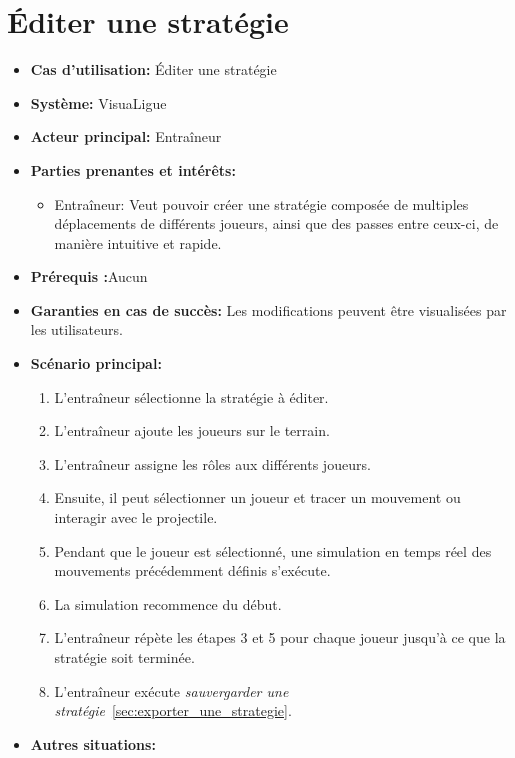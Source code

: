 \section{\'Editer une stratégie}
\label{sec:ajouter_une_strategie}
\begin{itemize}
    \item \textbf{Cas d'utilisation:} \'Editer une strat\'egie
    \item \textbf{Syst\`eme:} VisuaLigue
    \item \textbf{Acteur principal:} Entra\^ineur
    \item \textbf{Parties prenantes et int\'er\^ets:}
        \begin{itemize}
            \item Entraîneur: Veut pouvoir créer une stratégie composée de multiples déplacements de différents joueurs, ainsi que des passes entre ceux-ci, de manière intuitive et rapide.
        \end{itemize}
    \item \textbf{Prérequis :}Aucun
    \item \textbf{Garanties en cas de succ\`es:} Les modifications peuvent être visualisées par les utilisateurs.
    \item \textbf{Sc\'enario principal:}
        \begin{enumerate}
            \item L'entraîneur sélectionne la stratégie à éditer.
            \item L'entraîneur ajoute les joueurs sur le terrain.
            \item L'entraîneur assigne les r\^oles aux diff\'erents joueurs.
            \item Ensuite, il peut s\'electionner un joueur et tracer un mouvement ou interagir avec le projectile.
            \item Pendant que le joueur est s\'electionn\'e, une simulation en temps r\'eel des mouvements pr\'ec\'edemment d\'efinis s'ex\'ecute.
            \item La simulation recommence du d\'ebut.
            \item L'entraîneur répète les étapes 3 et 5 pour chaque joueur jusqu'à ce que la stratégie soit terminée.
            \item L'entraîneur exécute \textit{sauvergarder une stratégie}~\ref{sec:exporter_une_strategie}.
    \end{enumerate}
    \item \textbf{Autres situations:}
        \begin{itemize}

\end{itemize}
\end{itemize}
